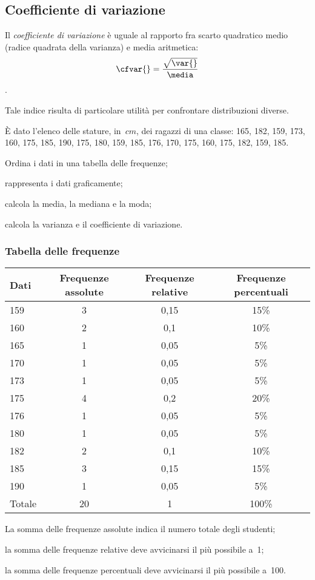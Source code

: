 \subsection{Coefficiente di variazione}

\begin{definizione}
Il \emph{coefficiente di variazione} è uguale al rapporto fra scarto 
quadratico medio (radice quadrata
della varianza) e media aritmetica:
\[\cfvar{} = \frac{\sqrt{\var{}}}{\media}\].
\end{definizione}
Tale indice risulta di particolare utilità per confrontare distribuzioni 
diverse.

 \begin{esempio}

È dato l'elenco delle stature, in~$\unit{cm}$, dei ragazzi di
una classe: 165, 182, 159, 173, 160, 175, 185, 190, 175, 180, 159, 185, 
176, 170, 175, 160, 175, 182, 159, 185.

\begin{enumeratea}
\item Ordina i dati in una tabella delle frequenze;
\item rappresenta i dati graficamente;
\item calcola la media, la mediana e la moda;
\item calcola la varianza e il coefficiente di variazione.
\end{enumeratea}

\subsubsection{Tabella delle frequenze}
\begin{center}
\begin{tabular}{lccc}
\toprule
Dati & Frequenze assolute & Frequenze relative & Frequenze percentuali\\
\midrule
159 & 3 & 0,15 & 15\% \\
160 & 2 & 0,1 & 10\% \\
165 & 1 & 0,05 & 5\% \\
170 & 1 & 0,05 & 5\% \\
173 & 1 & 0,05 & 5\% \\
175 & 4 & 0,2 & 20\% \\
176 & 1 & 0,05 & 5\% \\
180 & 1 & 0,05 & 5\% \\
182 & 2 & 0,1 & 10\% \\
185 & 3 & 0,15 & 15\% \\
190 & 1 & 0,05 & 5\% \\
\midrule
Totale & 20 & 1 & 100\% \\
\bottomrule
\end{tabular}
\end{center}
\begin{itemize*}
\item La somma delle frequenze assolute indica il numero totale degli 
studenti;
\item la somma delle frequenze relative deve avvicinarsi il più possibile 
a~1;
\item la somma delle frequenze percentuali deve avvicinarsi il più 
possibile a~100.
\end{itemize*}


\end{esempio}
